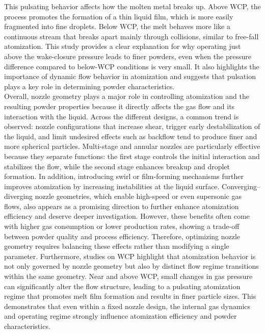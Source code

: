 \documentclass[../main]{subfiles}
\begin{document}
This pulsating behavior affects how the molten metal breaks up. Above WCP, the process promotes the formation of a thin liquid film, which is more easily fragmented into fine droplets. Below WCP, the melt behaves more like a continuous stream that breaks apart mainly through collisions, similar to free-fall atomization. This study provides a clear explanation for why operating just above the wake-closure pressure leads to finer powders, even when the pressure difference compared to below-WCP conditions is very small. It also highlights the importance of dynamic flow behavior in atomization and suggests that pulsation plays a key role in determining powder characteristics.\\

Overall, nozzle geometry plays a major role in controlling atomization and the resulting powder properties because it directly affects the gas flow and its interaction with the liquid. Across the different designs, a common trend is observed: nozzle configurations that increase shear, trigger early destabilization of the liquid, and limit undesired effects such as backflow tend to produce finer and more spherical particles. Multi-stage and annular nozzles are particularly effective because they separate functions: the first stage controls the initial interaction and stabilizes the flow, while the second stage enhances breakup and droplet formation. In addition, introducing swirl or film-forming mechanisms further improves atomization by increasing instabilities at the liquid surface. Converging–diverging nozzle geometries, which enable high-speed or even supersonic gas flows, also appears as a promising direction to further enhance atomization efficiency and deserve deeper investigation. However, these benefits often come with higher gas consumption or lower production rates, showing a trade-off between powder quality and process efficiency. Therefore, optimizing nozzle geometry requires balancing these effects rather than modifying a single parameter. Furthermore, studies on WCP highlight that atomization behavior is not only governed by nozzle geometry but also by distinct flow regime transitions within the same geometry. Near and above WCP, small changes in gas pressure can significantly alter the flow structure, leading to a pulsating atomization regime that promotes melt film formation and results in finer particle sizes. This demonstrates that even within a fixed nozzle design, the internal gas dynamics and operating regime strongly influence atomization efficiency and powder characteristics.
\end{document}
